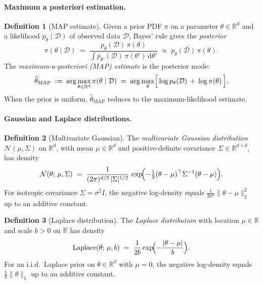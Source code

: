 \documentclass[11pt]{article}
\theoremstyle{definition}
\newtheorem{definition}{Definition}
\begin{document}
\paragraph{Maximum a posteriori estimation.}

\begin{definition}[MAP estimate]
Given a prior PDF $\pi$ on a parameter $\theta \in \mathbb{R}^{d}$ and a
likelihood $p_\theta(\mathcal{D})$ of observed data $\mathcal{D}$, Bayes'
rule gives the \emph{posterior}
\[
  \pi(\theta \mid \mathcal{D})
  \;=\; \frac{p_\theta(\mathcal{D})\, \pi(\theta)}{\int p_{\theta'}(\mathcal{D})\, \pi(\theta')\, \mathrm{d}\theta'}
  \;\propto\; p_\theta(\mathcal{D})\, \pi(\theta).
\]
The \emph{maximum-a-posteriori (MAP) estimate} is the posterior mode:
\[
  \widehat{\theta}_{\mathrm{MAP}}
  \;:=\; \arg\max_{\theta \in \mathbb{R}^{d}} \pi(\theta \mid \mathcal{D})
  \;=\; \arg\max_{\theta} \Bigl[\,\log p_\theta(\mathcal{D}) \,+\, \log \pi(\theta)\,\Bigr].
\]
When the prior is uniform, $\widehat{\theta}_{\mathrm{MAP}}$ reduces to the
maximum-likelihood estimate.
\end{definition}

\paragraph{Gaussian and Laplace distributions.}

\begin{definition}[Multivariate Gaussian]
The \emph{multivariate Gaussian distribution} $\mathcal{N}(\mu, \Sigma)$ on
$\mathbb{R}^{d}$, with mean $\mu \in \mathbb{R}^{d}$ and positive-definite
covariance $\Sigma \in \mathbb{R}^{d \times d}$, has density
\[
  \mathcal{N}(\theta;\, \mu, \Sigma)
  \;=\; \frac{1}{(2\pi)^{d/2}\, |\Sigma|^{1/2}}\,
  \exp\!\Bigl(-\tfrac{1}{2}(\theta - \mu)^{\top} \Sigma^{-1} (\theta - \mu)\Bigr).
\]
For isotropic covariance $\Sigma = \sigma^{2} I$, the negative log-density
equals $\tfrac{1}{2 \sigma^{2}} \|\theta - \mu\|_{2}^{2}$ up to an additive
constant.
\end{definition}

\begin{definition}[Laplace distribution]
The \emph{Laplace distribution} with location $\mu \in \mathbb{R}$ and
scale $b > 0$ on $\mathbb{R}$ has density
\[
  \mathrm{Laplace}(\theta;\, \mu, b) \;=\; \frac{1}{2 b}
  \exp\!\Bigl(-\frac{|\theta - \mu|}{b}\Bigr).
\]
For an i.i.d.\ Laplace prior on $\theta \in \mathbb{R}^{d}$ with $\mu = 0$,
the negative log-density equals $\tfrac{1}{b}\|\theta\|_{1}$ up to an additive
constant.
\end{definition}
\end{document}
